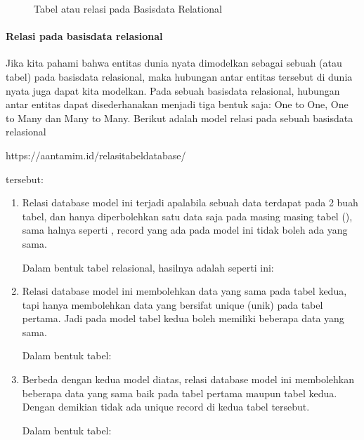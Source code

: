 \documentclass[letterpaper,10pt,english]{sphinxmanual}
\let\sphinxpxdimen\pdfpxdimen\else\newdimen\sphinxpxdimen
\begin{document}
\begin{figure}[htbp]
\centering
\capstart

\noindent\sphinxincludegraphics[height=300\sphinxpxdimen]{{2020-12-03-06-57-27}.png}
\caption{Tabel atau relasi pada Basisdata Relational}\label{\detokenize{sesi2/relationaldb:table}}\end{figure}


\paragraph{Relasi pada basisdata relasional}
\label{\detokenize{sesi2/relationaldb:relasi-pada-basisdata-relasional}}
Jika kita pahami bahwa entitas dunia nyata dimodelkan sebagai sebuah  (atau tabel) pada basisdata relasional, maka hubungan antar entitas tersebut di dunia nyata juga dapat kita modelkan. Pada sebuah basisdata relasional, hubungan antar entitas dapat disederhanakan menjadi tiga bentuk saja: One to One, One to Many dan Many to Many. Berikut adalah model relasi pada sebuah basisdata relasional%
\begin{footnote}[1]\sphinxAtStartFootnote
https://aantamim.id/relasi\sphinxhyphen{}tabel\sphinxhyphen{}database/
%
\end{footnote} tersebut:
\begin{enumerate}
%
\item {} 
Relasi database model ini terjadi apalabila sebuah data terdapat pada 2 buah tabel, dan hanya diperbolehkan satu data saja pada masing masing tabel (), sama halnya seperti , record yang ada pada model ini tidak boleh ada yang sama.


Dalam bentuk tabel relasional, hasilnya adalah seperti ini:


\item {} 
Relasi database model  ini membolehkan data yang sama pada tabel kedua, tapi hanya membolehkan data yang bersifat unique (unik) pada tabel pertama. Jadi pada model tabel kedua boleh memiliki beberapa data yang sama.

Dalam bentuk tabel:

\item {} 
Berbeda dengan kedua model diatas, relasi database model ini membolehkan beberapa data yang sama baik pada tabel pertama maupun tabel kedua. Dengan demikian tidak ada unique record di kedua tabel tersebut.

Dalam bentuk tabel:

\end{enumerate}
\end{document}
